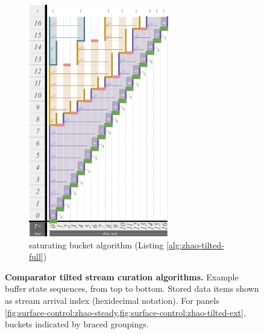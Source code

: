 \begin{figure}
\begin{subfigure}{0.32\linewidth}
\end{subfigure}%
\begin{subfigure}{0.32\linewidth}
\centering
\includegraphics[height=4in,trim={2.5cm 0 0 0},clip]{img/surface-control-tall-zhao-full-desat50}
\centering
\caption{saturating bucket algorithm (Listing \ref{alg:zhao-tilted-full})}
\label{fig:surface-control-tilted:saturating-bucket}
\end{subfigure}


\caption{%
\textbf{Comparator tilted stream curation algorithms.}
\footnotesize
Example buffer state sequences, from top to bottom.
Stored data items shown as stream arrival index (hexidecimal notation).
For panels \cref{fig:surface-control:zhao-steady,fig:surface-control:zhao-tilted-ext}, buckets indicated by braced groupings.
}
\label{fig:surface-control-tilted}

\end{figure}
